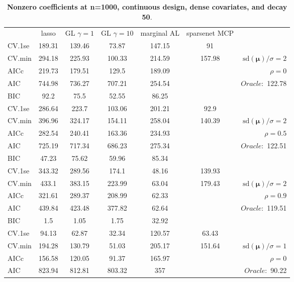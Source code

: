 \begin{table}\vspace{-.5cm}
\caption[l]{ { \bf Nonzero coefficients at n=1000, continuous design, 
dense covariates, and  decay  50}.}
\vspace{-.5cm}
\footnotesize{}
\begin{center}
\begin{tabular}{l*{5}{c}|r}
& lasso & GL $\gamma=1$ & GL $\gamma=10$ & marginal AL & sparsenet MCP  & \\
 \cline{1-7}
CV.1se & 189.31 & 139.46 & 73.87 & 147.15 & 91 & \\
CV.min & 294.18 & 225.93 & 100.33 & 214.59 & 157.98 &  $\mathrm{sd}(\mathbf{\mu})/\sigma=2$ \\
AICc & 219.73 & 179.51 & 129.5 & 189.09 & & $\rho=0$ \\
AIC & 744.98 & 736.27 & 707.21 & 254.54 & &  \multirow{2}{*}{$Oracle: $ 122.78} \\
BIC & 92.2 & 75.5 & 52.55 & 86.25 & &  \\
 \hline 
CV.1se & 286.64 & 223.7 & 103.06 & 201.21 & 92.9 & \\
CV.min & 396.96 & 324.17 & 154.11 & 258.04 & 140.39 &  $\mathrm{sd}(\mathbf{\mu})/\sigma=2$ \\
AICc & 282.54 & 240.41 & 163.36 & 234.93 & & $\rho=0.5$ \\
AIC & 725.19 & 717.34 & 686.23 & 275.34 & &  \multirow{2}{*}{$Oracle: $ 122.51} \\
BIC & 47.23 & 75.62 & 59.96 & 85.34 & &  \\
 \hline 
CV.1se & 343.32 & 289.56 & 174.1 & 48.16 & 139.93 & \\
CV.min & 433.1 & 383.15 & 223.99 & 63.04 & 179.43 &  $\mathrm{sd}(\mathbf{\mu})/\sigma=2$ \\
AICc & 321.61 & 289.37 & 208.99 & 62.33 & & $\rho=0.9$ \\
AIC & 439.84 & 423.48 & 377.82 & 62.64 & &  \multirow{2}{*}{$Oracle: $ 119.51} \\
BIC & 1.5 & 1.05 & 1.75 & 32.92 & &  \\
 \hline 
CV.1se & 94.13 & 62.87 & 32.34 & 120.57 & 63.43 & \\
CV.min & 194.28 & 130.79 & 51.03 & 205.17 & 151.64 &  $\mathrm{sd}(\mathbf{\mu})/\sigma=1$ \\
AICc & 156.58 & 120.05 & 91.37 & 165.97 & & $\rho=0$ \\
AIC & 823.94 & 812.81 & 803.32 & 357 & &  \multirow{2}{*}{$Oracle: $ 90.22} \\

\end{tabular}
\end{center}
\end{table}
